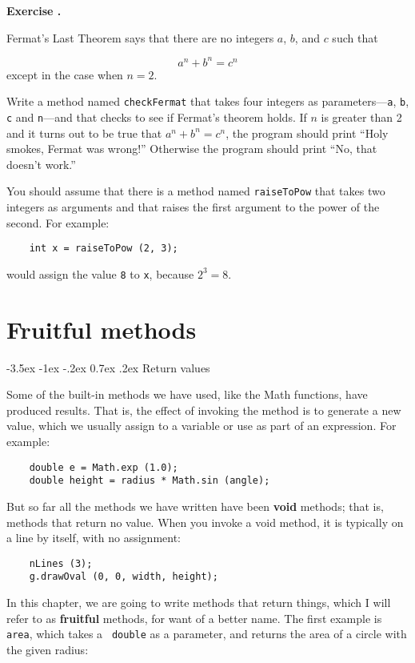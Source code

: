\documentclass{book}
\makeatletter
\newcounter{exercisenum}
\renewcommand{\theexercisenum}{{\thechapter}.\arabic{exercisenum}}
\newenvironment{exercisesize}{\begin{small}}{\end{small}}
\newcommand{\exerciseheader}[2]{                                          
     
  \begin{exercisesize}                                                    
     
     
  \def\theenumi{\alph{enumi}}                                             
  \def\labelenumi{\theenumi.}                                             
  \def\theenumii{\roman{enumii}}                                          
  \def\labelenumii{\theenumii.}                                           
  {\bf Exercise {#1}{#2}}\hspace{0.1in}                 
}
\newcommand{\startexercise}[1]{%
  \refstepcounter{exercisenum}                                            
  \exerciseheader{\theexercisenum}{#1}                                    
}
\newcommand{\stopexercise}{%
  {\hfill}                                                               
  \end{exercisesize}      
}
\newcommand{\normaldif}{}
\newenvironment{exercise}{\startexercise{\normaldif{}}}{\stopexercise}
\renewcommand{\section}{\@startsection 
    {section} {1} {0mm}%
    {-3.5ex \@plus -1ex \@minus -.2ex}%
    {0.7ex \@plus.2ex}%
    {\normalfont\Large\bfseries}}
\newcommand{\clearemptydoublepage}{\newpage{\pagestyle{empty}\cleardoublepage}}
\newcommand{\beforechapter}{
    \cleardoublepage 
    \setcounter{exercisenum}{0}
}
\makeatother
\begin{document}
\begin{exercise}
Fermat's Last Theorem says that there are no integers
$a$, $b$, and $c$ such that

\[a^n + b^n = c^n \]
%
except in the case when $n=2$.

Write a method named {\tt checkFermat} that takes four
integers as parameters---{\tt a}, {\tt b}, {\tt c} and {\tt n}---and
that checks to see if Fermat's theorem holds.  If
$n$ is greater than 2 and it turns out to be true that 
$a^n + b^n = c^n$,
the program should print ``Holy smokes, Fermat was wrong!''
Otherwise the program should print ``No, that doesn't work.''

You should assume that there is a method named {\tt raiseToPow}
that takes two integers as arguments and that raises the
first argument to the power of the second.  For example:

\begin{verbatim}
    int x = raiseToPow (2, 3);
\end{verbatim}
%
would assign the value {\tt 8} to {\tt x}, because $2^3 = 8$.
\end{exercise}


\beforechapter
\chapter{Fruitful methods}
\label{chap05}

\section{Return values}

Some of the built-in methods we have used, like the Math
functions, have produced results.  That is, the effect of
invoking the method is to generate a new value, which we
usually assign to a variable or use as part of an expression.
For example:

\begin{verbatim}
    double e = Math.exp (1.0);
    double height = radius * Math.sin (angle);
\end{verbatim}
%
But so far all the methods we have written have been {\bf void}
methods; that is, methods that return no value.  When you invoke
a void method, it is typically on a line by itself, with
no assignment:

\begin{verbatim}
    nLines (3);
    g.drawOval (0, 0, width, height);
\end{verbatim}
%
In this chapter, we are going to write methods that return things,
which I will refer to as {\bf fruitful} methods, for want of a better
name.  The first example is {\tt area}, which takes a {\tt
double} as a parameter, and returns the area of a circle with the
given radius:
\end{document}
